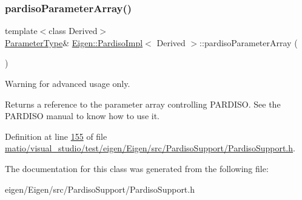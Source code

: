 \mbox{\label{class_eigen_1_1_pardiso_impl_a42a7983796076edc52e0e8d2869610ec}} 
\subsubsection{\texorpdfstring{pardiso\+Parameter\+Array()}{pardisoParameterArray()}\hspace{0.1cm}{\footnotesize\ttfamily [2/2]}}
{\footnotesize\ttfamily template$<$class Derived$>$ \\
\hyperlink{group___core___module}{Parameter\+Type}\& \hyperlink{class_eigen_1_1_pardiso_impl}{Eigen\+::\+Pardiso\+Impl}$<$ Derived $>$\+::pardiso\+Parameter\+Array (\begin{DoxyParamCaption}{ }\end{DoxyParamCaption})\hspace{0.3cm}{\ttfamily [inline]}}

\begin{DoxyWarning}{Warning}
for advanced usage only. 
\end{DoxyWarning}
\begin{DoxyReturn}{Returns}
a reference to the parameter array controlling P\+A\+R\+D\+I\+SO. See the P\+A\+R\+D\+I\+SO manual to know how to use it. 
\end{DoxyReturn}


Definition at line \hyperlink{matio_2visual__studio_2test_2eigen_2_eigen_2src_2_pardiso_support_2_pardiso_support_8h_source_l00155}{155} of file \hyperlink{matio_2visual__studio_2test_2eigen_2_eigen_2src_2_pardiso_support_2_pardiso_support_8h_source}{matio/visual\+\_\+studio/test/eigen/\+Eigen/src/\+Pardiso\+Support/\+Pardiso\+Support.\+h}.



The documentation for this class was generated from the following file\+:\begin{DoxyCompactItemize}
\item 
eigen/\+Eigen/src/\+Pardiso\+Support/\+Pardiso\+Support.\+h\end{DoxyCompactItemize}
